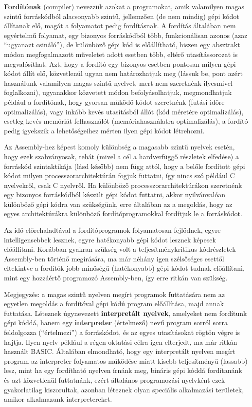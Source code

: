 \textbf{Fordítónak} (compiler) nevezzük azokat a programokat, amik valamilyen magas szintű forráskódból alacsonyabb szintű, jellemzően (de nem mindig) gépi kódot állítanak elő, magát a folyamatot pedig fordításnak. A fordítás általában nem egyértelmű folyamat, egy bizonyos forráskódból több, funkcionálisan azonos (azaz ``ugyanazt csináló''), de különböző gépi kód is előállítható, hiszen egy absztrakt módon megfogalmazott műveletet adott esetben több, eltérő utasítássorozat is megvalósíthat. Azt, hogy a fordító egy bizonyos esetben pontosan milyen gépi kódot állít elő, közvetlenül ugyan nem határozhatjuk meg (lássuk be, pont azért használunk valamilyen magas szintű nyelvet, mert nem szeretnénk ilyesmivel foglalkozni), ugyanakkor közvetett módon befolyásolhatjuk, megmondhatjuk például a fordítónak, hogy gyorsan működő kódot szeretnénk (futási időre optimalizálás), vagy inkább kevés utasításból állót (kód méretére optimalizálás), esetleg kevés memóriát felhasználót (memóriahasználatra optimalizálás), a fordító pedig igyekszik a lehetőségeihez mérten ilyen gépi kódot létrehozni.

Az Assembly-hez képest komoly különbség a magasabb szintű nyelvek esetén, hogy ezek szabványosak, tehát (mivel a cél a hardverfüggő részletek elfedése) a forráskód szintaktikája (lásd később) nem függ attól, hogy a belőle fordított gépi kódot milyen processzorarchitektúrán fogjuk futtatni, így nincs szó például C nyelvekről, csak C nyelvről. Ha különböző processzorarchitektúrákon szeretnénk egy bizonyos forráskódból készült gépi kódot futtatni, akkor nyilvánvalóan különböző gépi kódra van szükségünk, erre általában az a megoldás, hogy az egyes architektúrákra különböző fordítóprogramokkal fordítjuk le a forráskódot.

Az idő előrehaladtával a fordítóprogramok folyamatosan fejlődnek, egyre intelligensebbek lesznek, egyre hatékonyabb gépi kódot lesznek képesek előállítani. Korábban gyakran szükség volt a teljesítménykritikus kódrészletek Assembly-ben történő megírására, ma már néhány igen szélsőséges esettől eltekintve a fordítók jobb minőségű (hatékonyabb) gépi kódot tudnak előállítani, mint egy hozzáértő programozó Assembly-ben, így erre ritkán van szükség.

Megjegyzés: a magas szintű nyelven megírt programok futtatására nem az egyetlen megoldás a fordítóval gépi kódú program előállítása, majd annak futtatása. Léteznek úgynevezett \textbf{interpretált nyelvek}, amelyeket nem fordítunk gépi kóddá, hanem egy \textbf{interpreter} (értelmező) nevű program sorról sorra feldolgozza (``értelmezi'') a forráskódot, és az egyes utasításokat rögtön végre is hajtja. Ilyen nyelv például a régen oktatási célra igen elterjedt, ma már ritkán használt BASIC. Általában elmondható, hogy egy interpretált nyelven megírt program az interpreter folyamatos működése miatt kisebb teljesítményű (lassabb) lesz, mint ha egy fordítható nyelven írnánk meg, bináris gépi kóddá fordítanánk és azt közvetlenül futtatnánk, ezért általános programozási nyelvként ezek gyakorlatilag kiszorultak, azonban léteznek olyan speciális alkalmazási területek, amikor alkalmazunk interpretereket.


